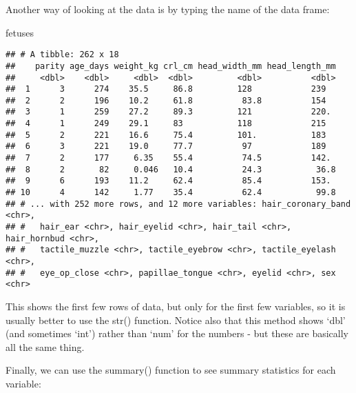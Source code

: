 \documentclass[
]{article}
\newenvironment{Shaded}{\begin{snugshade}}{\end{snugshade}}
\newcommand{\KeywordTok}[1]{\textcolor[rgb]{0.13,0.29,0.53}{\textbf{#1}}}
\newcommand{\NormalTok}[1]{#1}
\newcommand{\OperatorTok}[1]{\textcolor[rgb]{0.81,0.36,0.00}{\textbf{#1}}}
\newcommand{\StringTok}[1]{\textcolor[rgb]{0.31,0.60,0.02}{#1}}
\begin{document}
Another way of looking at the data is by typing the name of the data
frame:

\begin{Shaded}
\begin{Highlighting}[]
\NormalTok{fetuses}
\end{Highlighting}
\end{Shaded}

\begin{verbatim}
## # A tibble: 262 x 18
##    parity age_days weight_kg crl_cm head_width_mm head_length_mm
##     <dbl>    <dbl>     <dbl>  <dbl>         <dbl>          <dbl>
##  1      3      274    35.5     86.8         128            239  
##  2      2      196    10.2     61.8          83.8          154  
##  3      1      259    27.2     89.3         121            220. 
##  4      1      249    29.1     83           118            215  
##  5      2      221    16.6     75.4         101.           183  
##  6      3      221    19.0     77.7          97            189  
##  7      2      177     6.35    55.4          74.5          142. 
##  8      2       82     0.046   10.4          24.3           36.8
##  9      6      193    11.2     62.4          85.4          153. 
## 10      4      142     1.77    35.4          62.4           99.8
## # ... with 252 more rows, and 12 more variables: hair_coronary_band <chr>,
## #   hair_ear <chr>, hair_eyelid <chr>, hair_tail <chr>, hair_hornbud <chr>,
## #   tactile_muzzle <chr>, tactile_eyebrow <chr>, tactile_eyelash <chr>,
## #   eye_op_close <chr>, papillae_tongue <chr>, eyelid <chr>, sex <chr>
\end{verbatim}

This shows the first few rows of data, but only for the first few
variables, so it is usually better to use the str() function. Notice
also that this method shows `dbl' (and sometimes `int') rather than
`num' for the numbers - but these are basically all the same thing.

Finally, we can use the summary() function to see summary statistics for
each variable:

\begin{Shaded}
\end{Shaded}
\end{document}

